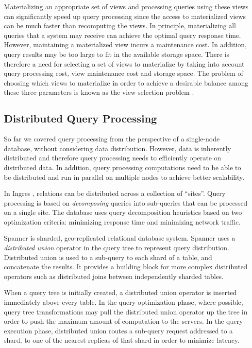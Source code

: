 Materializing an appropriate set of views and processing queries using these views can significantly speed up
query processing since the access to materialized views can be much faster than recomputing the views.
In principle, materializing all queries that a system may receive can achieve the optimal query response time.
However, maintaining a materialized view incurs a maintenance cost.
In addition, query results may be too large to fit in the available storage space.
There is therefore a need for selecting a set of views to materialize by taking into account query processing cost,
view maintenance cost and storage space.
The problem of choosing which views to materialize in order to achieve a desirable balance among these three
parameters is known as the view selection problem \cite{gupta:viewselection, mami:viewselection}.

\subsection{Distributed Query Processing}
\label{sec:distributed_qp}
So far we covered query processing from the perspective of a single-node database, without considering data distribution.
However, data is inherently distributed \cite{bacon:spanner, cockroachdb:docs} and therefore query processing needs to
efficiently operate on distributed data.
In addition, query processing computations need to be able to be distributed and run in parallel on multiple nodes to
achieve better scalability.

In Ingres \cite{epstein:ingres}, relations can be distributed across a collection of ``sites''.
Query processing is based on \textit{decomposing} queries into sub-queries that can be processed on a single site.
The database uses query decomposition heuristics based on two optimization criteria:
minimizing response time and minimizing network traffic.

Spanner \cite{bacon:spanner} is sharded, geo-replicated relational database system.
Spanner uses a \textit{distributed union} operator in the query tree to represent query distribution.
Distributed union is used to a sub-query to each shard of a table, and concatenate the results.
It provides a building block for more complex distributed operators such as distributed joins between independently
sharded tables.

When a query tree is initially created, a distributed union operator is inserted immediately above every table.
In the query optimization phase, where possible, query tree transformations may pull the distributed union operator up
the tree in order to push the maximum amount of computation to the servers.
In the query execution phase, distributed union routes a sub-query request addressed to a shard, to one of the nearest
replicas of that shard in order to minimize latency.

